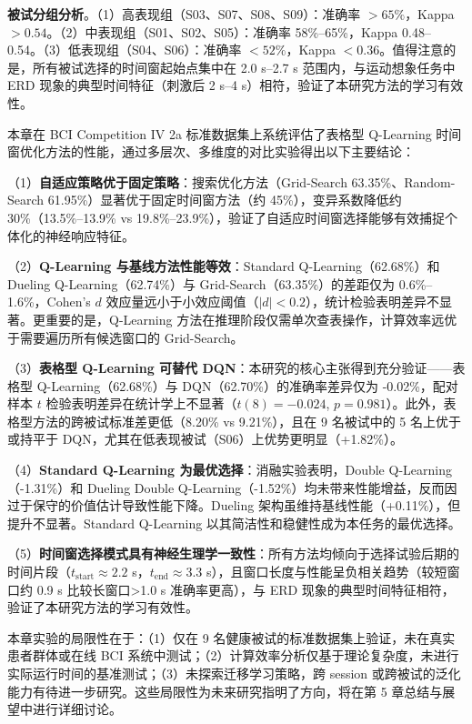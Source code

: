 \textbf{被试分组分析}。（1）高表现组（S03、S07、S08、S09）：准确率 $> 65\%$，Kappa $> 0.54$。（2）中表现组（S01、S02、S05）：准确率 58\%--65\%，Kappa 0.48--0.54。（3）低表现组（S04、S06）：准确率 $< 52\%$，Kappa $< 0.36$。值得注意的是，所有被试选择的时间窗起始点集中在 2.0 s--2.7 s 范围内，与运动想象任务中 ERD 现象的典型时间特征（刺激后 2 s--4 s）相符\cite{pfurtscheller1999event}，验证了本研究方法的学习有效性。


本章在 BCI Competition IV 2a 标准数据集上系统评估了表格型 Q-Learning 时间窗优化方法的性能，通过多层次、多维度的对比实验得出以下主要结论：

（1）\textbf{自适应策略优于固定策略}：搜索优化方法（Grid-Search 63.35\%、Random-Search 61.95\%）显著优于固定时间窗方法（约 45\%），变异系数降低约 30\%（13.5\%--13.9\% vs 19.8\%--23.9\%），验证了自适应时间窗选择能够有效捕捉个体化的神经响应特征。

（2）\textbf{Q-Learning 与基线方法性能等效}：Standard Q-Learning（62.68\%）和 Dueling Q-Learning（62.74\%）与 Grid-Search（63.35\%）的差距仅为 0.6\%--1.6\%，Cohen's $d$ 效应量远小于小效应阈值（$|d| < 0.2$），统计检验表明差异不显著。更重要的是，Q-Learning 方法在推理阶段仅需单次查表操作，计算效率远优于需要遍历所有候选窗口的 Grid-Search。

（3）\textbf{表格型 Q-Learning 可替代 DQN}：本研究的核心主张得到充分验证——表格型 Q-Learning（62.68\%）与 DQN（62.70\%）的准确率差异仅为 -0.02\%，配对样本 $t$ 检验表明差异在统计学上不显著（$t(8) = -0.024$, $p = 0.981$）。此外，表格型方法的跨被试标准差更低（8.20\% vs 9.21\%），且在 9 名被试中的 5 名上优于或持平于 DQN，尤其在低表现被试（S06）上优势更明显（+1.82\%）。

（4）\textbf{Standard Q-Learning 为最优选择}：消融实验表明，Double Q-Learning（-1.31\%）和 Dueling Double Q-Learning（-1.52\%）均未带来性能增益，反而因过于保守的价值估计导致性能下降。Dueling 架构虽维持基线性能（+0.11\%），但提升不显著。Standard Q-Learning 以其简洁性和稳健性成为本任务的最优选择。

（5）\textbf{时间窗选择模式具有神经生理学一致性}：所有方法均倾向于选择试验后期的时间片段（$t_{\text{start}} \approx 2.2$ s，$t_{\text{end}} \approx 3.3$ s），且窗口长度与性能呈负相关趋势（较短窗口约 0.9 s 比较长窗口>1.0 s 准确率更高），与 ERD 现象的典型时间特征相符，验证了本研究方法的学习有效性。

本章实验的局限性在于：（1）仅在 9 名健康被试的标准数据集上验证，未在真实患者群体或在线 BCI 系统中测试；（2）计算效率分析仅基于理论复杂度，未进行实际运行时间的基准测试；（3）未探索迁移学习策略，跨 session 或跨被试的泛化能力有待进一步研究。这些局限性为未来研究指明了方向，将在第 5 章总结与展望中进行详细讨论。